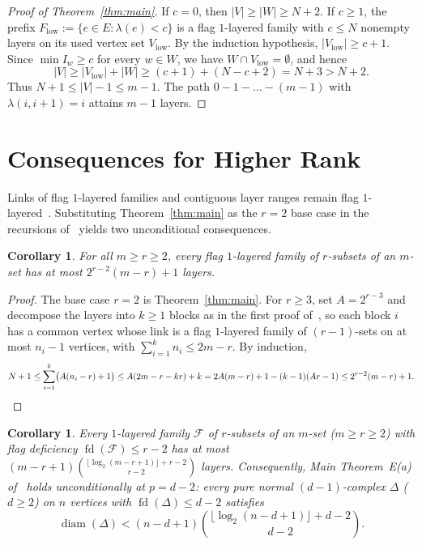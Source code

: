 \documentclass[11pt]{article}
\newtheorem{corollary}[theorem]{Corollary}
\DeclareMathOperator{\fd}{fd}
\DeclareMathOperator{\diam}{diam}
\begin{document}
\begin{proof}[Proof of Theorem~\ref{thm:main}]
If $c = 0$, then $|V| \ge |W| \ge N + 2$. If $c \ge 1$, the prefix $F_{\mathrm{low}} := \{e \in E : \lambda(e) < c\}$ is a flag $1$-layered family with $c \le N$ nonempty layers on its used vertex set $V_{\mathrm{low}}$. By the induction hypothesis, $|V_{\mathrm{low}}| \ge c + 1$. Since $\min I_w \ge c$ for every $w \in W$, we have $W \cap V_{\mathrm{low}} = \emptyset$, and hence
\[
|V| \ge |V_{\mathrm{low}}| + |W| \ge (c + 1) + (N - c + 2) = N + 3 > N + 2.
\]
Thus $N + 1 \le |V| - 1 \le m - 1$. The path $0 - 1 - \dots - (m - 1)$ with $\lambda(i, i + 1) = i$ attains $m - 1$ layers.
\end{proof}

\section{Consequences for Higher Rank}

Links of flag $1$-layered families and contiguous layer ranges remain flag $1$-layered~\cite[Section~7]{BM2026}. Substituting Theorem~\ref{thm:main} as the $r = 2$ base case in the recursions of~\cite{BM2026} yields two unconditional consequences.

\begin{corollary}\label{cor:lb}
For all $m \ge r \ge 2$, every flag $1$-layered family of $r$-subsets of an $m$-set has at most $2^{r-2}(m - r) + 1$ layers.
\end{corollary}

\begin{proof}
The base case $r = 2$ is Theorem~\ref{thm:main}. For $r \ge 3$, set $A = 2^{r-3}$ and decompose the layers into $k \ge 1$ blocks as in the first proof of~\cite[Theorem~2.1]{BM2026}, so each block $i$ has a common vertex whose link is a flag $1$-layered family of $(r - 1)$-sets on at most $n_i - 1$ vertices, with $\sum_{i=1}^k n_i \le 2m - r$. By induction,
\[
N + 1 \le \sum_{i=1}^k \bigl(A(n_i - r) + 1\bigr) \le A(2m - r - kr) + k = 2A(m - r) + 1 - (k - 1)(Ar - 1) \le 2^{r-2}(m - r) + 1. \qedhere
\]
\end{proof}

\begin{corollary}\label{cor:mainE}
Every $1$-layered family $\mathcal{F}$ of $r$-subsets of an $m$-set ($m \ge r \ge 2$) with flag deficiency $\fd(\mathcal{F}) \le r - 2$ has at most $(m - r + 1)\binom{\lfloor \log_2(m - r + 1) \rfloor + r - 2}{r - 2}$ layers. Consequently, Main Theorem~E(a) of~\cite{BM2026} holds unconditionally at $p = d - 2$: every pure normal $(d - 1)$-complex $\Delta$ ($d \ge 2$) on $n$ vertices with $\fd(\Delta) \le d - 2$ satisfies
\[
\diam(\Delta) < (n - d + 1)\binom{\lfloor \log_2(n - d + 1) \rfloor + d - 2}{d - 2}.
\]
\end{corollary}
\end{document}
